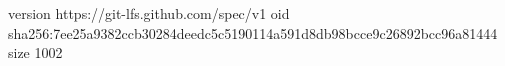 version https://git-lfs.github.com/spec/v1
oid sha256:7ee25a9382ccb30284deedc5c5190114a591d8db98bcce9c26892bcc96a81444
size 1002
